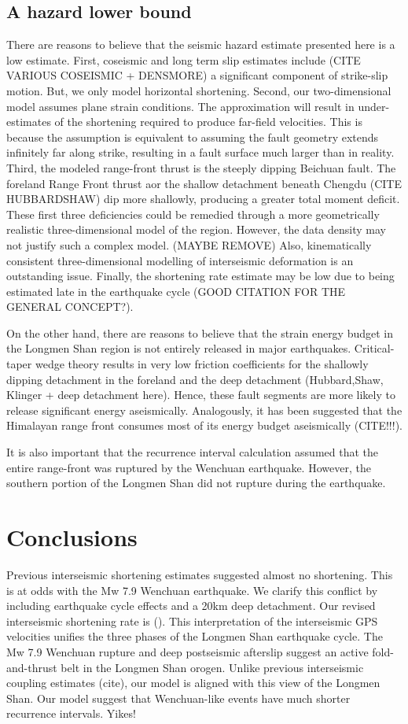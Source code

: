 \documentclass[12pt]{article}
\begin{document}
\subsection{A hazard lower bound}
There are reasons to believe that the seismic hazard estimate presented here is a low estimate.
First, coseismic and long term slip estimates include (CITE VARIOUS COSEISMIC + DENSMORE) a significant component of strike-slip motion. But, we only model horizontal shortening. 
Second, our two-dimensional model assumes plane strain conditions. 
The approximation will result in under-estimates of the shortening required to produce far-field velocities.
This is because the assumption is equivalent to assuming the fault geometry extends infinitely far along strike, resulting in a fault surface much larger than in reality. 
Third, the modeled range-front thrust is the steeply dipping Beichuan fault. The foreland Range Front thrust aor the shallow detachment beneath Chengdu (CITE HUBBARDSHAW) dip more shallowly, producing a greater total moment deficit.
These first three deficiencies could be remedied through a more geometrically realistic three-dimensional model of the region. However, the data density may not justify such a complex model. 
(MAYBE REMOVE) Also, kinematically consistent three-dimensional modelling of interseismic deformation is an outstanding issue. 
Finally, the shortening rate estimate may be low due to being estimated late in the earthquake cycle (GOOD CITATION FOR THE GENERAL CONCEPT?). 

On the other hand, there are reasons to believe that the strain energy budget in the Longmen Shan region is not entirely released in major earthquakes. Critical-taper wedge theory results in very low friction coefficients for the shallowly dipping detachment in the foreland and the deep detachment (Hubbard,Shaw, Klinger + deep detachment here). Hence, these fault segments are more likely to release significant energy aseismically. Analogously, it has been suggested that the Himalayan range front consumes most of its energy budget aseismically (CITE!!!).

It is also important that the recurrence interval calculation assumed that the entire range-front was ruptured by the Wenchuan earthquake.
However, the southern portion of the Longmen Shan did not rupture during the earthquake. 

\section{Conclusions}
Previous interseismic shortening estimates suggested almost no shortening. This is at odds with the Mw 7.9 Wenchuan earthquake. We clarify this conflict by including earthquake cycle effects and a 20km deep detachment. Our revised interseismic shortening rate is ().
This interpretation of the interseismic GPS velocities unifies the three phases of the Longmen Shan earthquake cycle. The Mw 7.9 Wenchuan rupture and deep postseismic afterslip suggest an active fold-and-thrust belt in the Longmen Shan orogen. Unlike previous interseismic coupling estimates (cite), our model is aligned with this view of the Longmen Shan. 
Our model suggest that Wenchuan-like events have much shorter recurrence intervals. Yikes!
\end{document}
